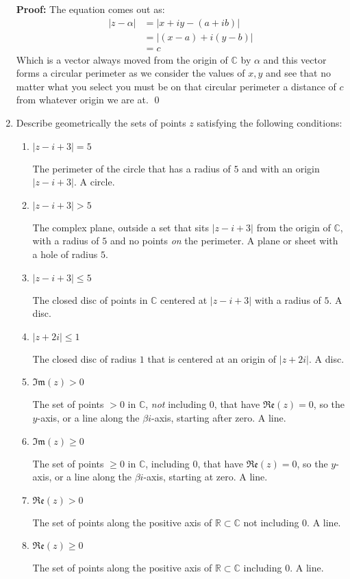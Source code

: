 \begin{enumerate}
	      \textbf{Proof:}
	      The equation comes out as:
	      \begin{align*}
		      |z - \alpha| & = | x + iy - (a + ib) |  \\
		                   & = | (x - a) + i(y - b) | \\
		                   & = c
	      \end{align*}
	      Which is a vector always moved from the origin of $\mathbb{C}$ by $\alpha$ and this vector forms a circular
	      perimeter as we consider the values of $x, y$ and see that no matter what you select you must be on that
	      circular perimeter a distance of $c$ from whatever origin we are at.
	      \qed

	\item Describe geometrically the sets of points $z$ satisfying the following conditions:
	      \begin{enumerate}
		      \item $|z - i + 3| = 5$

		            The perimeter of the circle that has a radius of $5$ and with an origin $|z - i + 3|.$ A circle.
		      \item $|z - i + 3| > 5$

		            The complex plane, outside a set that sits $|z -i + 3|$ from the origin of $\mathbb{C}$, with
		            a radius of $5$ and no points \textit{on} the perimeter. A plane or sheet with a hole of
		            radius $5.$

		      \item $|z - i + 3| \leq 5$

		            The closed disc of points in $\mathbb{C}$ centered at $|z - i + 3|$ with a radius of $5.$ A disc.

		      \item $|z + 2i| \leq 1$

		            The closed disc of radius $1$ that is centered at an origin of $|z + 2i|.$ A disc.
		      \item $\mathfrak{Im}(z) > 0$

		            The set of points $> 0$ in $\mathbb{C}$, \emph{not} including $0$, that have
		            $\mathfrak{Re}(z)= 0$, so the $y$-axis, or a line along the $\beta i$-axis, starting
		            after zero. A line.
		      \item $\mathfrak{Im}(z) \geq 0$

		            The set of points $\geq 0$ in $\mathbb{C}$, including $0$, that have $\mathfrak{Re}(z)= 0$,
		            so the $y$-axis, or a line along the $\beta i$-axis, starting at zero. A line.
		      \item $\mathfrak{Re}(z) > 0$

		            The set of points along the positive axis of $\mathbb{R} \subset \mathbb{C}$ not including $0.$
		            A line.
		      \item $\mathfrak{Re}(z) \geq 0$

		            The set of points along the positive axis of $\mathbb{R} \subset \mathbb{C}$ including $0.$
		            A line.
	      \end{enumerate}
\end{enumerate}

\newpage